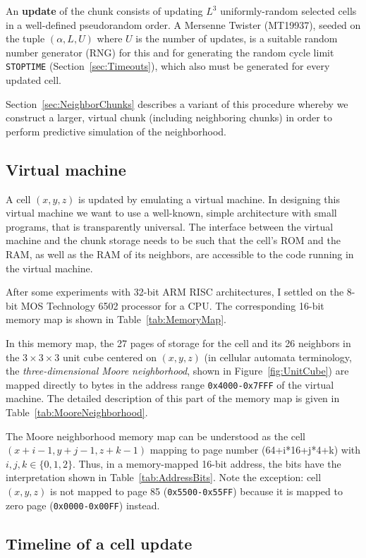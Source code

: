 \documentclass{article}
\newcommand\code[1]{{\tt #1}}
\newcommand\hex[1]{{\tt 0x#1}}
\newcommand\hexrange[2]{\hex{#1}{\tt -}\hex{#2}}
\begin{document}
An {\bf update} of the chunk consists of updating $L^3$ uniformly-random selected cells in a well-defined pseudorandom order.
A Mersenne Twister (MT19937),
seeded on the tuple $(\alpha,L,U)$ where $U$ is the number of updates,
is a suitable random number generator (RNG) for this
and for generating the random cycle limit \code{STOPTIME} (Section~\ref{sec:Timeouts}),
which also must be generated for every updated cell.

Section~\ref{sec:NeighborChunks} describes a variant of this procedure whereby we construct a larger,
virtual chunk (including neighboring chunks) in order to perform predictive simulation of the neighborhood.

\subsection{Virtual machine}

A cell $(x,y,z)$ is updated by emulating a virtual machine.
In designing this virtual machine we want to use a well-known, simple architecture with small programs,
that is transparently universal.
The interface between the virtual machine and the chunk storage
needs to be such that the cell's ROM and the RAM, as well as the RAM of its neighbors,
are accessible to the code running in the virtual machine.

After some experiments with 32-bit ARM RISC architectures,
I settled on the 8-bit MOS Technology 6502 processor for a CPU.
The corresponding 16-bit memory map is shown in Table~\ref{tab:MemoryMap}.

In this memory map, the 27 pages of storage
for the cell and its 26 neighbors
in the $3 \times 3 \times 3$ unit cube centered on $(x,y,z)$
(in cellular automata terminology, the {\em three-dimensional Moore neighborhood}, shown in Figure~\ref{fig:UnitCube})
are mapped directly to bytes in the address range \hexrange{4000}{7FFF} of the virtual machine.
The detailed description of this part of the memory map
is given in Table~\ref{tab:MooreNeighborhood}.

The Moore neighborhood memory map can be understood as the cell $(x+i-1,y+j-1,z+k-1)$
mapping to page number (64+i*16+j*4+k) with $i,j,k \in \{0,1,2\}$.
Thus, in a memory-mapped 16-bit address, the bits have the interpretation shown in Table~\ref{tab:AddressBits}.
Note the exception: cell $(x,y,z)$ is not mapped to page 85 (\hexrange{5500}{55FF})
because it is mapped to zero page (\hexrange{0000}{00FF}) instead.

\subsection{Timeline of a cell update}
\label{sec:Timeline}
\end{document}
